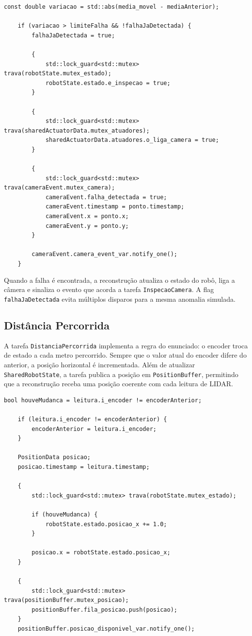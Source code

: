 \documentclass[12pt,a4paper]{article}
\begin{document}
    \begin{lstlisting}[style=cppstyle]
    const double variacao = std::abs(media_movel - mediaAnterior);

    if (variacao > limiteFalha && !falhaJaDetectada) {
        falhaJaDetectada = true;

        {
            std::lock_guard<std::mutex> trava(robotState.mutex_estado);
            robotState.estado.e_inspecao = true;
        }

        {
            std::lock_guard<std::mutex> trava(sharedActuatorData.mutex_atuadores);
            sharedActuatorData.atuadores.o_liga_camera = true;
        }

        {
            std::lock_guard<std::mutex> trava(cameraEvent.mutex_camera);
            cameraEvent.falha_detectada = true;
            cameraEvent.timestamp = ponto.timestamp;
            cameraEvent.x = ponto.x;
            cameraEvent.y = ponto.y;
        }

        cameraEvent.camera_event_var.notify_one();
    }
    \end{lstlisting}

    Quando a falha é encontrada, a reconstrução atualiza o estado do robô, liga a câmera e sinaliza o evento que acorda a tarefa \texttt{InspecaoCamera}. A flag \texttt{falhaJaDetectada} evita múltiplos disparos para a mesma anomalia simulada.

    \subsection{Distância Percorrida}

    A tarefa \texttt{DistanciaPercorrida} implementa a regra do enunciado: o encoder troca de estado a cada metro percorrido. Sempre que o valor atual do encoder difere do anterior, a posição horizontal é incrementada. Além de atualizar \texttt{SharedRobotState}, a tarefa publica a posição em \texttt{PositionBuffer}, permitindo que a reconstrução receba uma posição coerente com cada leitura de LIDAR.

    \begin{lstlisting}[style=cppstyle]
    bool houveMudanca = leitura.i_encoder != encoderAnterior;

    if (leitura.i_encoder != encoderAnterior) {
        encoderAnterior = leitura.i_encoder;
    }

    PositionData posicao;
    posicao.timestamp = leitura.timestamp;

    {
        std::lock_guard<std::mutex> trava(robotState.mutex_estado);

        if (houveMudanca) {
            robotState.estado.posicao_x += 1.0;
        }

        posicao.x = robotState.estado.posicao_x;
    }

    {
        std::lock_guard<std::mutex> trava(positionBuffer.mutex_posicao);
        positionBuffer.fila_posicao.push(posicao);
    }
    positionBuffer.posicao_disponivel_var.notify_one();
    \end{lstlisting}
\end{document}
